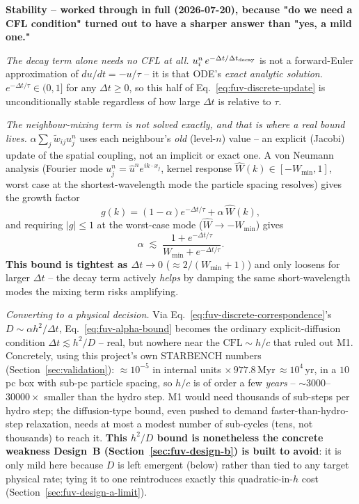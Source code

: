 \textbf{Stability -- worked through in full (2026-07-20), because "do
we need a CFL condition" turned out to have a sharper answer than
"yes, a mild one."}

\textit{The decay term alone needs no CFL at all.} $u_i^n\,e^{-\Delta
t/\Delta t_{\rm decay}}$ is not a forward-Euler approximation of
$du/dt=-u/\tau$ -- it is that ODE's \emph{exact analytic solution}.
$e^{-\Delta t/\tau}\in(0,1]$ for any $\Delta t\ge0$, so this half of
Eq.~\ref{eq:fuv-discrete-update} is unconditionally stable regardless
of how large $\Delta t$ is relative to $\tau$.

\textit{The neighbour-mixing term is not solved exactly, and that is
where a real bound lives.} $\alpha\sum_j\tilde w_{ij}u_j^n$ uses each
neighbour's \emph{old} (level-$n$) value -- an explicit (Jacobi) update
of the spatial coupling, not an implicit or exact one. A von Neumann
analysis (Fourier mode $u_j^n=\hat u^n e^{ik\cdot x_j}$, kernel
response $\hat W(k)\in[-W_{\min},1]$, worst case at the
shortest-wavelength mode the particle spacing resolves) gives the
growth factor
\begin{equation}
  g(k) = (1-\alpha)e^{-\Delta t/\tau} + \alpha\,\hat W(k),
  \label{eq:fuv-growth-factor}
\end{equation}
and requiring $|g|\le1$ at the worst-case mode ($\hat W\to-W_{\min}$)
gives
\begin{equation}
  \alpha \;\lesssim\; \frac{1+e^{-\Delta t/\tau}}{W_{\min}+e^{-\Delta t/\tau}} .
  \label{eq:fuv-alpha-bound}
\end{equation}
\textbf{This bound is tightest as $\Delta t\to0$} ($\approx2/(W_{\min}+1)$)
and only loosens for larger $\Delta t$ -- the decay term actively
\emph{helps} by damping the same short-wavelength modes the mixing
term risks amplifying.

\textit{Converting to a physical decision.} Via
Eq.~\ref{eq:fuv-discrete-correspondence}'s $D\sim\alpha h^2/\Delta t$,
Eq.~\ref{eq:fuv-alpha-bound} becomes the ordinary explicit-diffusion
condition $\Delta t\lesssim h^2/D$ -- real, but nowhere near the
$\text{CFL}\sim h/c$ that ruled out M1. Concretely, using this
project's own STARBENCH numbers (Section~\ref{sec:validation}):
$\approx10^{-5}$ in internal units
$\times\,977.8\,$Myr$\,\approx10^4\,$yr, in a $10\,$pc box with
sub-pc particle spacing, so $h/c$ is of order a few \emph{years} --
$\sim3000$--$30000\times$ smaller than the hydro step. M1 would need
thousands of sub-steps per hydro step; the diffusion-type bound, even
pushed to demand faster-than-hydro-step relaxation, needs at most a
modest number of sub-cycles (tens, not thousands) to reach it.
\textbf{This $h^2/D$ bound is nonetheless the concrete weakness Design~B
(Section~\ref{sec:fuv-design-b}) is built to avoid}: it is only mild
here because $D$ is left emergent (below) rather than tied to any
target physical rate; tying it to one reintroduces exactly this
quadratic-in-$h$ cost (Section~\ref{sec:fuv-design-a-limit}).


